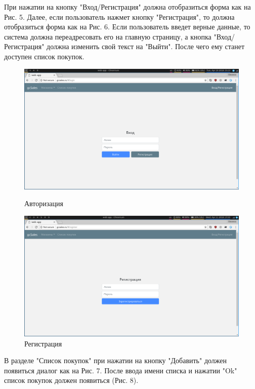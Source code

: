 При нажатии на кнопку "Вход/Регистрация" должна отобразиться форма как на Рис.
5. Далее, если пользователь нажмет кнопку "Регистрация", то должна отобразиться
форма как на Рис. 6. Если пользователь введет верные данные, то система должна
переадресовать его на главную страницу, а кнопка "Вход/Регистрация" должна
изменить свой текст на "Выйти". После чего ему станет доступен список покупок.

\begin{figure}[H]
    \centering
    \includegraphics[width=\textwidth]{./screenshots/login.png}
    \caption{Авторизация}
    \endminipage\hfill
    \includegraphics[width=\textwidth]{./screenshots/register.png}
    \caption{Регистрация}
    \endminipage
\end{figure}

В разделе "Список покупок" при нажатии на кнопку "Добавить" должен появиться
диалог как на Рис. 7. После ввода имени списка и нажатии "Ok" список покупок
должен появиться (Рис. 8).

